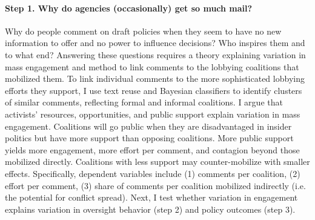 \paragraph{Step 1. Why do agencies (occasionally) get so much mail?} %
Why do people comment on draft policies when they seem to have no new information to offer and no power to influence decisions? Who inspires them and to what end? 
Answering these questions requires a theory explaining variation in mass engagement and method to link comments to the lobbying coalitions that mobilized them.  
To link individual comments to the more sophisticated lobbying efforts they support, I use text reuse and Bayesian classifiers to identify clusters of similar comments, reflecting formal and informal coalitions.
I argue that activists' resources, opportunities, and public support explain variation in mass engagement. %
Coalitions will go public when they are disadvantaged in insider politics but have more support than opposing coalitions. More public support yields more engagement, more effort per comment, and contagion beyond those mobilized directly. Coalitions with less support may counter-mobilize with smaller effects.
Specifically, dependent variables include 
(1) comments per coalition, %
(2) effort per comment, %
(3) share of comments per coalition mobilized indirectly (i.e. the potential for conflict spread).
Next, I test whether variation in engagement explains variation in oversight behavior (step 2) and policy outcomes (step 3).

